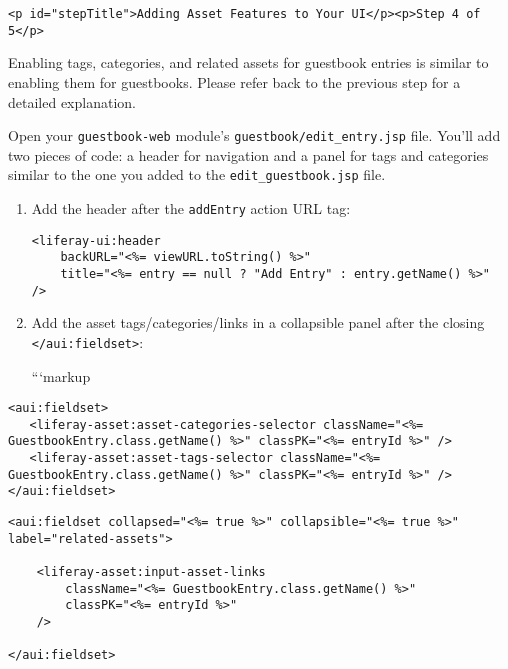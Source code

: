 \begin{verbatim}
<p id="stepTitle">Adding Asset Features to Your UI</p><p>Step 4 of 5</p>
\end{verbatim}

Enabling tags, categories, and related assets for guestbook entries is
similar to enabling them for guestbooks. Please refer back to the
previous step for a detailed explanation.

Open your \texttt{guestbook-web} module's
\texttt{guestbook/edit\_entry.jsp} file. You'll add two pieces of code:
a header for navigation and a panel for tags and categories similar to
the one you added to the \texttt{edit\_guestbook.jsp} file.

\begin{enumerate}
\def\labelenumi{\arabic{enumi}.}
\item
  Add the header after the \texttt{addEntry} action URL tag:

\begin{verbatim}
<liferay-ui:header
    backURL="<%= viewURL.toString() %>"
    title="<%= entry == null ? "Add Entry" : entry.getName() %>"
/>
\end{verbatim}
\item
  Add the asset tags/categories/links in a collapsible panel after the
  closing \texttt{\textless{}/aui:fieldset\textgreater{}}:

  ```markup
\end{enumerate}

\begin{verbatim}
<aui:fieldset>
   <liferay-asset:asset-categories-selector className="<%= GuestbookEntry.class.getName() %>" classPK="<%= entryId %>" />
   <liferay-asset:asset-tags-selector className="<%= GuestbookEntry.class.getName() %>" classPK="<%= entryId %>" />
</aui:fieldset>
\end{verbatim}

\begin{verbatim}
<aui:fieldset collapsed="<%= true %>" collapsible="<%= true %>" label="related-assets">
        
    <liferay-asset:input-asset-links
        className="<%= GuestbookEntry.class.getName() %>"
        classPK="<%= entryId %>"
    />
        
</aui:fieldset>
\end{verbatim}


